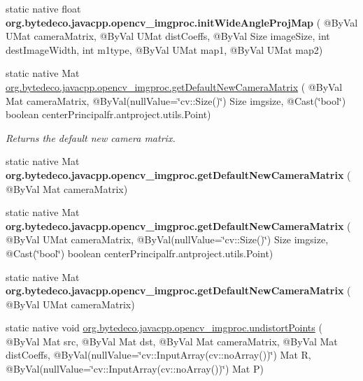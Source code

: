 \begin{DoxyCompactItemize}
\item 
\mbox{\label{group__imgproc__transform_gabd59413d81a2a999b9437f22d27a24fc}} 
static native float {\bfseries org.\+bytedeco.\+javacpp.\+opencv\+\_\+imgproc.\+init\+Wide\+Angle\+Proj\+Map} ( @By\+Val U\+Mat camera\+Matrix, @By\+Val U\+Mat dist\+Coeffs, @By\+Val Size image\+Size, int dest\+Image\+Width, int m1type, @By\+Val U\+Mat map1, @By\+Val U\+Mat map2)
\item 
static native Mat \hyperlink{group__imgproc__transform_gadf9fb3deefd512a073b449832fe60679}{org.\+bytedeco.\+javacpp.\+opencv\+\_\+imgproc.\+get\+Default\+New\+Camera\+Matrix} ( @By\+Val Mat camera\+Matrix, @By\+Val(null\+Value=\char`\"{}cv\+::\+Size()\char`\"{}) Size imgsize, @Cast(\char`\"{}bool\char`\"{}) boolean center\+Principal\+fr.antproject.utils.Point)
\begin{DoxyCompactList}\small\item\em Returns the default new camera matrix. \end{DoxyCompactList}\item 
\mbox{\label{group__imgproc__transform_gaedb64877b79e75f7e81d5f11a07e17ac}} 
static native Mat {\bfseries org.\+bytedeco.\+javacpp.\+opencv\+\_\+imgproc.\+get\+Default\+New\+Camera\+Matrix} ( @By\+Val Mat camera\+Matrix)
\item 
\mbox{\label{group__imgproc__transform_ga92946780977d683b3185be16382896c0}} 
static native Mat {\bfseries org.\+bytedeco.\+javacpp.\+opencv\+\_\+imgproc.\+get\+Default\+New\+Camera\+Matrix} ( @By\+Val U\+Mat camera\+Matrix, @By\+Val(null\+Value=\char`\"{}cv\+::\+Size()\char`\"{}) Size imgsize, @Cast(\char`\"{}bool\char`\"{}) boolean center\+Principal\+fr.antproject.utils.Point)
\item 
\mbox{\label{group__imgproc__transform_ga8c2618a6f671b8cd211b32d88cc19426}} 
static native Mat {\bfseries org.\+bytedeco.\+javacpp.\+opencv\+\_\+imgproc.\+get\+Default\+New\+Camera\+Matrix} ( @By\+Val U\+Mat camera\+Matrix)
\item 
static native void \hyperlink{group__imgproc__transform_gaacf4ed74dd09b28d673cc4b0f0257aa8}{org.\+bytedeco.\+javacpp.\+opencv\+\_\+imgproc.\+undistort\+Points} ( @By\+Val Mat src, @By\+Val Mat dst, @By\+Val Mat camera\+Matrix, @By\+Val Mat dist\+Coeffs, @By\+Val(null\+Value=\char`\"{}cv\+::\+Input\+Array(cv\+::no\+Array())\char`\"{}) Mat R, @By\+Val(null\+Value=\char`\"{}cv\+::\+Input\+Array(cv\+::no\+Array())\char`\"{}) Mat P)

\end{DoxyCompactItemize}

